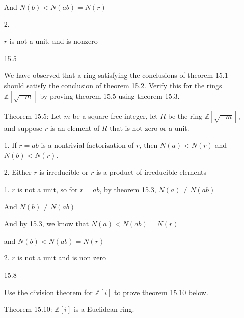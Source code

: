 \documentclass[12pt]{article}
\begin{document}
\begin{itemize}
	And $N(b) < N(ab) = N(r)$

	2. 

	$r$ is not a unit, and is nonzero



\newpage 
\item[15.5]

	We have observed that a ring satisfying the conclusions of theorem 15.1 should satisfy the conclusion of theorem 15.2. Verify this for the rings $\mathbb{Z}[\sqrt{-m}]$ by proving theorem 15.5 using theorem 15.3.

	Theorem 15.5:	Let $m$ be a square free integer, let $R$ be the ring $\mathbb{Z}[\sqrt{-m}]$, and suppose $r$ is an element of $R$ that is not zero or a unit.

	1. If $r = ab$ is a nontrivial factorization of $r$, then $N(a) < N(r)$ and $N(b) < N(r)$.

	2. Either $r$ is irreducible or $r$ is a product of irreducible elements

	1. $r$ is not a unit, so for $r = ab$, by theorem 15.3, $N(a) \neq N(ab)$

	And $N(b) \neq N(ab)$

	And by 15.3, we know that $N(a) < N(ab) = N(r)$

	and $N(b) < N(ab) = N(r)$

	2. $r$ is not a unit and is non zero


\newpage 
\item[15.8]

	Use the division theorem for $\mathbb{Z}[i]$ to prove theorem 15.10 below.

	Theorem 15.10: $\mathbb{Z}[i]$ is a Euclidean ring.
	

\end{itemize}
\end{document}
